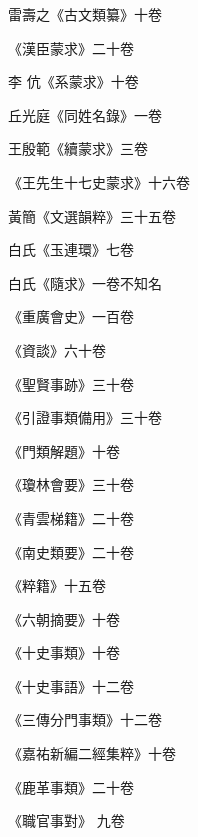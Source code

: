 \begin{pinyinscope}
 雷壽之《古文類纂》十卷



 《漢臣蒙求》二十卷



 李
 伉《系蒙求》十卷



 丘光庭《同姓名錄》一卷



 王殷範《續蒙求》三卷



 《王先生十七史蒙求》十六卷



 黃簡《文選韻粹》三十五卷



 白氏《玉連環》七卷



 白氏《隨求》一卷不知名



 《重廣會史》一百卷



 《資談》六十卷



 《聖賢事跡》三十卷



 《引證事類備用》三十卷



 《門類解題》十卷



 《瓊林會要》三十卷



 《青雲梯籍》二十卷



 《南史類要》二十卷



 《粹籍》十五卷



 《六朝摘要》十卷



 《十史事類》十卷



 《十史事語》十二卷



 《三傳分門事類》十二卷



 《嘉祐新編二經集粹》十卷



 《鹿革事類》二十卷



 《職官事對》
 九卷




\end{pinyinscope}
